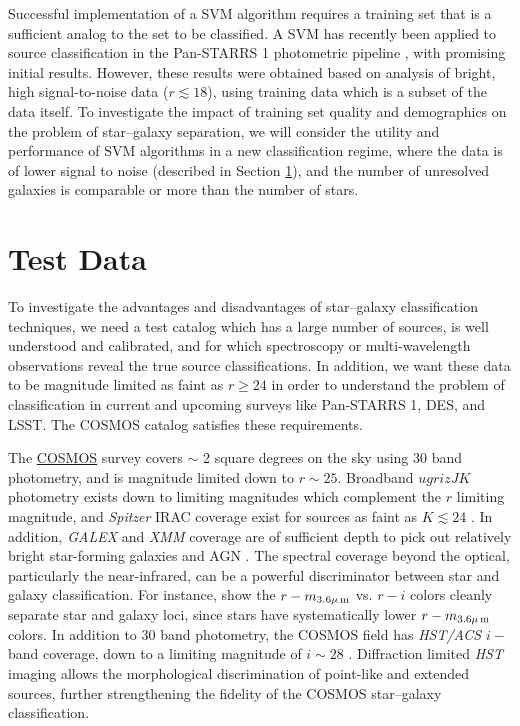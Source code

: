 \documentclass[12pt,preprint]{aastex}
\begin{document}
Successful implementation of a SVM algorithm requires a training set
that is a sufficient analog to the set to be classified.  A SVM has
recently been applied to source classification in the Pan-STARRS 1
photometric pipeline \citep{saglia12}, with promising initial
results. However, these results were obtained based on analysis of 
bright, high signal-to-noise data ($r\lesssim18$), using training data 
which is a subset of the data itself.
To investigate the impact of training set quality and demographics on
the problem of star--galaxy separation, we will consider the utility
and performance of SVM algorithms in a new classification regime,
where the data is of lower signal to noise (described in Section
\ref{sec:data}), and the number of unresolved galaxies is comparable
or more than the number of stars.

\section{Test Data}
\label{sec:data}

To investigate the advantages and disadvantages of star--galaxy
classification techniques, we need a test catalog which has a large
number of sources, is well understood and calibrated, and for
which spectroscopy or multi-wavelength observations reveal the true
source classifications.  In addition, we want these data to be
magnitude limited as faint as $r\ge24$ in order to understand the
problem of classification in current and upcoming surveys like
Pan-STARRS 1, DES, and LSST.  The COSMOS catalog satisfies these
requirements.   

The \href{http://cosmos.astro.caltech.edu/}{COSMOS} survey \citep{scoville07a} covers $\sim$ 2 square degrees on
the sky using 30 band photometry, and is magnitude limited down to $r
\sim 25$.  Broadband $ugrizJK$ photometry exists down to limiting
magnitudes which complement the $r$ limiting magnitude, and {\it
  Spitzer} IRAC coverage exist for sources as faint as $K\lesssim24$ 
  \citep{capak07,sanders07,taniguchi07}.
In addition, {\it GALEX} and {\it XMM} coverage are of sufficient
depth to pick out relatively bright star-forming galaxies and AGN 
\citep{hasinger07,zamojski07}.
The spectral coverage beyond the optical, particularly the
near-infrared, can be a powerful discriminator between star and
galaxy classification.  For instance, \citet{ilbert09} show the
$r-m_{\rm 3.6\mu\,m}$ vs. $r-i$ colors cleanly separate star and
galaxy loci, since stars have systematically lower $r-m_{\rm
  3.6\mu\,m}$ colors.  In addition to 30 band photometry, the COSMOS
field has \textit{HST/ACS} $i-$band coverage, down to a limiting
magnitude of $i\sim28$ \citep{koekemoer07,scoville07b}.  Diffraction
limited \textit{HST} imaging allows the morphological discrimination
of point-like and extended sources, further strengthening the fidelity
of the COSMOS star--galaxy classification.
\end{document}
